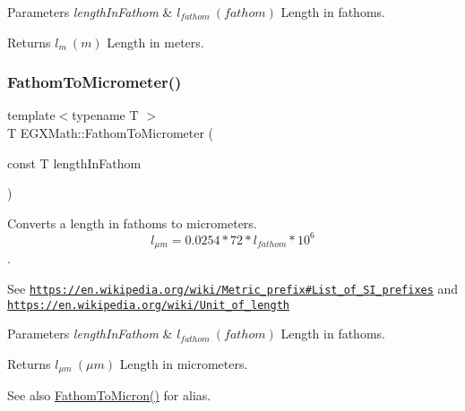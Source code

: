 \begin{DoxyParams}{Parameters}
{\em length\+In\+Fathom} & $ l_{fathom}\ (fathom)$ Length in fathoms. \\
\hline
\end{DoxyParams}
\begin{DoxyReturn}{Returns}
$ l_{m}\ (m)$ Length in meters. 
\end{DoxyReturn}
\mbox{\label{group___e_g_x_math-_conversions-_length_conversions-_nautical-_fathom-_s_i_gabc04c2f094545c3ae8d4e493e4af417e}} 
\subsubsection{\texorpdfstring{Fathom\+To\+Micrometer()}{FathomToMicrometer()}}
{\footnotesize\ttfamily template$<$typename T $>$ \\
T E\+G\+X\+Math\+::\+Fathom\+To\+Micrometer (\begin{DoxyParamCaption}\item[{const T}]{length\+In\+Fathom }\end{DoxyParamCaption})}



Converts a length in fathoms to micrometers. \[ l_{\mu m}=0.0254 * 72 * l_{fathom} * 10^{6} \]. 

See \href{https://en.wikipedia.org/wiki/Metric_prefix#List_of_SI_prefixes}{\tt https\+://en.\+wikipedia.\+org/wiki/\+Metric\+\_\+prefix\#\+List\+\_\+of\+\_\+\+S\+I\+\_\+prefixes} and \href{https://en.wikipedia.org/wiki/Unit_of_length}{\tt https\+://en.\+wikipedia.\+org/wiki/\+Unit\+\_\+of\+\_\+length} 
\begin{DoxyParams}{Parameters}
{\em length\+In\+Fathom} & $ l_{fathom}\ (fathom)$ Length in fathoms. \\
\hline
\end{DoxyParams}
\begin{DoxyReturn}{Returns}
$ l_{\mu m}\ (\mu m)$ Length in micrometers. 
\end{DoxyReturn}
\begin{DoxySeeAlso}{See also}
\mbox{\hyperlink{group___e_g_x_math-_conversions-_length_conversions-_nautical-_fathom-_non-_s_i_ga491b6bb1b4db49ba22471e9ca9855198}{Fathom\+To\+Micron()}} for alias. 
\end{DoxySeeAlso}
\mbox{\label{group___e_g_x_math-_conversions-_length_conversions-_nautical-_fathom-_s_i_gaa9e44fa377dc5d69f70d3974311ec89d}} 
